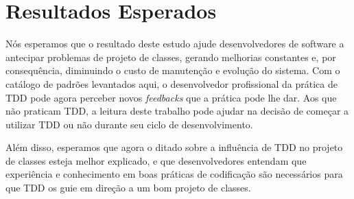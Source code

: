 \section{Resultados Esperados}

Nós esperamos que o resultado deste estudo ajude desenvolvedores de software a antecipar
problemas de projeto de classes, gerando melhorias constantes e, por consequência, 
diminuindo o custo de manutenção e evolução do sistema.
Com o catálogo de padrões levantados aqui, o desenvolvedor profissional da prática de TDD pode agora 
perceber novos \textit{feedbacks} que a prática pode lhe dar. Aos que não praticam TDD,
a leitura deste trabalho pode ajudar na decisão de começar a utilizar TDD ou não durante
seu ciclo de desenvolvimento.

Além disso, esperamos que agora o ditado sobre a influência de TDD no projeto de classes esteja
melhor explicado, e que desenvolvedores entendam que experiência e conhecimento em boas 
práticas de codificação são necessários para que TDD os guie em direção a um bom
projeto de classes.

